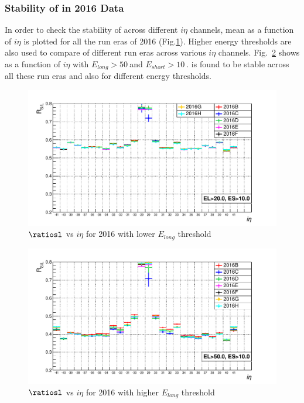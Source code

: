 \subsubsection{Stability of \ratiosl in 2016 Data}
In order to check the stability of \ratiosl across different $i\eta$ channels, mean \ratiosl as a function of $i\eta$ is plotted for all the run eras of 2016 (Fig.\ref{RatioVsIeta2016EL20ES10}). Higher energy thresholds are also used to compare \ratiosl of different run eras across various $i\eta$ channels. Fig.~\ref{RatioVsIeta2016EL50ES10} shows \ratiosl as a function of $i\eta$ with $E_{long}>50~$\gev and $E_{short}>10~$\gev. \ratiosl is found to be stable across all these run eras and also for different energy thresholds.\\
\begin{figure}[h!]%
\centering
\includegraphics[width=0.8\linewidth]{../Figures/Chap2/ImageFiles_HF/Ratio/2016/RatioVsIeta2016EL20ES10.pdf}
\caption{$\ratiosl$ vs $i\eta$ for 2016 with lower $E_{long}$ threshold}
\label{RatioVsIeta2016EL20ES10}
\end{figure}
\begin{figure}[h!]%
\centering
\includegraphics[width=0.8\linewidth]{../Figures/Chap2/ImageFiles_HF/Ratio/2016/RatioVsIeta2016EL50ES10.pdf}
\caption{$\ratiosl$ vs $i\eta$ for 2016 with higher $E_{long}$ threshold}
\label{RatioVsIeta2016EL50ES10}
\end{figure}

